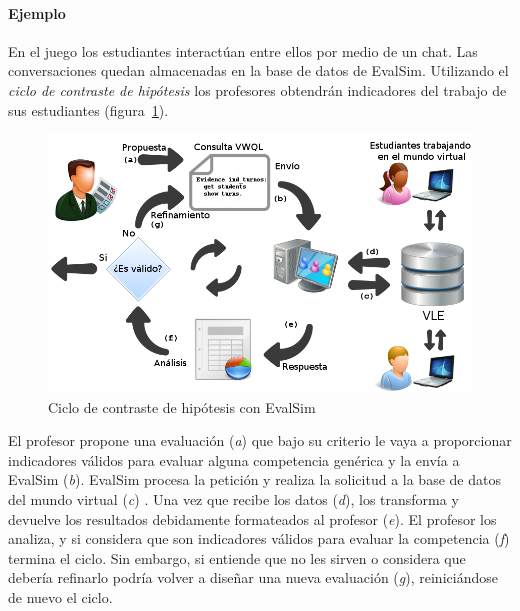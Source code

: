 			\paragraph{Ejemplo}

			En el juego los estudiantes interactúan entre ellos por medio de un chat. Las conversaciones quedan almacenadas en la base de datos de EvalSim. Utilizando el \emph{ciclo de contraste de hipótesis} los profesores obtendrán indicadores del trabajo de sus estudiantes (figura~\ref{fig:EvsDiagram}).

\begin{figure}
  \begin{center}
    \includegraphics[scale=0.4]{EvsDiagram.png}
  \end{center}
  \caption{Ciclo de contraste de hipótesis con EvalSim}
  \label{fig:EvsDiagram}
\end{figure}

			El profesor propone una evaluación (\emph{a}) que bajo su criterio le vaya a proporcionar indicadores válidos para evaluar alguna competencia genérica y la envía a EvalSim (\emph{b}). EvalSim procesa la petición y realiza la solicitud a la base de datos del mundo virtual (\emph{c}) . Una vez que recibe los datos (\emph{d}), los transforma y devuelve los resultados debidamente formateados al profesor (\emph{e}). El profesor los analiza, y si considera que son indicadores válidos para evaluar la competencia (\emph{f}) termina el ciclo. Sin embargo, si entiende que no les sirven o considera que debería refinarlo podría volver a diseñar una nueva evaluación (\emph{g}), reiniciándose de nuevo el ciclo.



